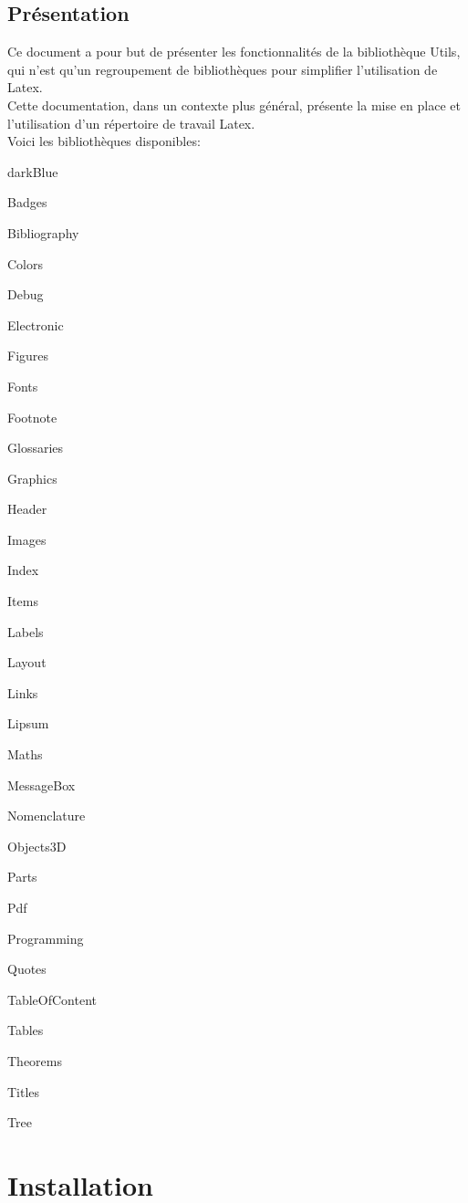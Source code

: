 {\section{Présentation}
Ce document a pour but de présenter les fonctionnalités de la bibliothèque Utils, qui n'est qu'un 
regroupement de bibliothèques pour simplifier l'utilisation de Latex. \\

Cette documentation, dans un contexte plus général, présente la mise en place et l'utilisation d'un répertoire de travail Latex. \\
Voici les bibliothèques disponibles: 

\begin{items}{darkBlue}{\faviconLeaf}
\item Badges
\item Bibliography
\item Colors
\item Debug
\item Electronic
\item Figures
\item Fonts
\item Footnote
\item Glossaries
\item Graphics
\item Header
\item Images
\item Index
\item Items
\item Labels
\item Layout
\item Links
\item Lipsum
\item Maths
\item MessageBox
\item Nomenclature
\item Objects3D
\item Parts
\item Pdf
\item Programming
\item Quotes
\item TableOfContent
\item Tables
\item Theorems
\item Titles
\item Tree
\end{items}\chapter{Installation}

}
